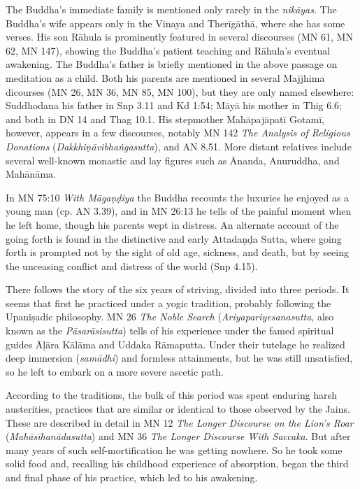 \documentclass[12pt,openany]{book}%
\begin{document}
The Buddha’s immediate family is mentioned only rarely in the \textit{\textsanskrit{nikāyas}}. The Buddha’s wife appears only in the Vinaya and \textsanskrit{Therīgāthā}, where she has some verses. His son \textsanskrit{Rāhula} is prominently featured in several discourses (MN 61, MN 62, MN 147), showing the Buddha’s patient teaching and \textsanskrit{Rāhula}’s eventual awakening. The Buddha’s father is briefly mentioned in the above passage on meditation as a child. Both his parents are mentioned in several Majjhima dicourses (MN 26, MN 36, MN 85, MN 100), but they are only named elsewhere: Suddhodana his father in Snp 3.11 and Kd 1:54; \textsanskrit{Māyā} his mother in Thig 6.6; and both in DN 14 and Thag 10.1. His stepmother \textsanskrit{Mahāpajāpatī} \textsanskrit{Gotamī}, however, appears in a few discourses, notably MN 142 \textit{The Analysis of Religious Donations} (\textit{\textsanskrit{Dakkhiṇāvibhaṅgasutta}}), and AN 8.51. More distant relatives include several well-known monastic and lay figures such as Ānanda, Anuruddha, and \textsanskrit{Mahānāma}.

In MN 75:10 \textit{With \textsanskrit{Māgaṇḍiya}} the Buddha recounts the luxuries he enjoyed as a young man (cp. AN 3.39), and in MN 26:13 he tells of the painful moment when he left home, though his parents wept in distress. An alternate account of the going forth is found in the distinctive and early \textsanskrit{Attadaṇḍa} Sutta, where going forth is prompted not by the sight of old age, sickness, and death, but by seeing the unceasing conflict and distress of the world (Snp 4.15).

There follows the story of the six years of striving, divided into three periods. It seems that first he practiced under a yogic tradition, probably following the \textsanskrit{Upaniṣadic} philosophy. MN 26 \textit{The Noble Search} (\textit{Ariyapariyesanasutta}, also known as the \textit{\textsanskrit{Pāsarāsisutta}}) tells of his experience under the famed spiritual guides \textsanskrit{Āḷāra} \textsanskrit{Kālāma} and Uddaka \textsanskrit{Rāmaputta}. Under their tutelage he realized deep immersion (\textit{\textsanskrit{samādhi}}) and formless attainments, but he was still unsatisfied, so he left to embark on a more severe ascetic path.

According to the traditions, the bulk of this period was spent enduring harsh austerities, practices that are similar or identical to those observed by the Jains. These are described in detail in MN 12 \textit{The Longer Discourse on the Lion’s Roar} (\textit{\textsanskrit{Mahāsīhanādasutta}}) and MN 36 \textit{The Longer Discourse With Saccaka}. But after many years of such self-mortification he was getting nowhere. So he took some solid food and, recalling his childhood experience of absorption, began the third and final phase of his practice, which led to his awakening.
\end{document}
